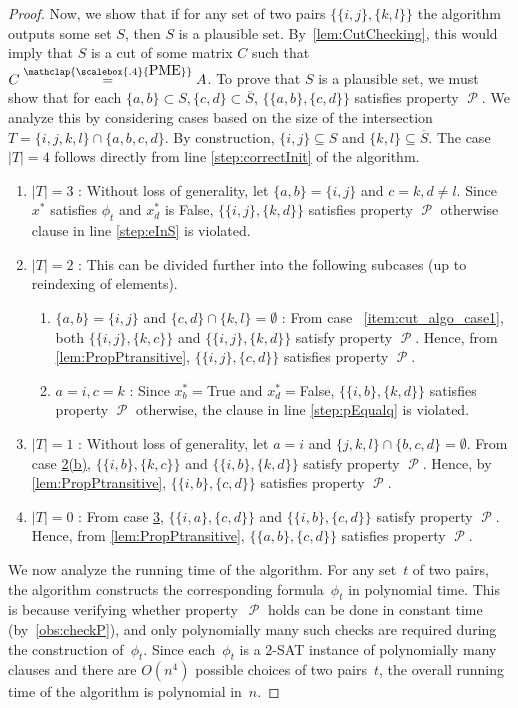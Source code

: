 \documentclass[11pt,letterpaper]{article}
\newcommand{\comp}[1]{\overline{#1}}
\DeclareMathOperator{\calP}{\mathcal{P}}
\newcommand{\pp}[2]{\{\{#1\},\{#2\}\}}
\newcommand{\PME}{\stackrel{\mathclap{\scalebox{.4}{\mbox{PME}}}}{=}}
\begin{document}
{{{\begin{proof}
Now, we show that if for any set of two pairs $\pp{i,j}{k,l}$ the algorithm outputs some set $S$, then $S$ is a plausible set. By~\cref{lem:CutChecking}, this would imply that $S$ is a cut of some matrix $C $ such that $C\PME A$. To prove that $S$ is a plausible set, we must show that for each  $\{a,b\} \subset S, \{c,d\}\subset \comp{S}$, $\pp{a,b}{c,d}$ satisfies property $\calP$. We analyze this by considering cases based on the size of the intersection $T = \{i,j,k,l\}\cap \{a,b,c,d\}$. By construction, $\{i,j\} \subseteq S$ and $\{k,l\} \subseteq \comp{S}$. The case $|T|=4$ follows directly from line \ref{step:correctInit} of the algorithm.
\begin{enumerate}
\item \label{item:cut_algo_case1} $|T|=3$ : Without loss of generality, let $\{a,b\}=\{i,j\}$ and $c=k, d\neq l$. Since $x^*$ satisfies $\phi_t$ and $x^*_d$ is False, $\pp{i,j}{k,d}$ satisfies property $\calP$ otherwise clause in line  \ref{step:eInS} is violated.
\item  $|T|=2$ :  This can be divided further into the following subcases (up to reindexing of elements). 
\begin{enumerate}
\item  $\{a,b\}=\{i,j\}$ and $\{c,d\}\cap \{k,l\}=\emptyset$ : From case ~\ref{item:cut_algo_case1}, both $\pp{i,j}{k,c}$ and $\pp{i,j}{k,d}$ satisfy property $\calP$. Hence, from \cref{lem:PropPtransitive}, $\pp{i,j}{c,d}$ satisfies property $\calP$. 
    \item \label{item:cut_algo_case2b} $a=i, c=k$ : Since $x^*_b=$True and $x^*_d=$False, $\pp{i,b}{k,d}$ satisfies property $\calP$ otherwise, the clause in line \ref{step:pEqualq} is violated. 
\end{enumerate}
\item \label{item:cut_algo_case3} $|T|=1$ : Without loss of generality, let $a=i$ and $\{j,k,l\}\cap\{b,c,d\}=\emptyset$. From case \hyperref[item:cut_algo_case2b]{2(b)}, $\pp{i,b}{k,c}$ and $\pp{i,b}{k,d}$ satisfy property $\calP$. Hence, by \cref{lem:PropPtransitive}, $\pp{i,b}{c,d}$ satisfies property $\calP$. 

\item $|T|=0$ : From case \hyperref[item:cut_algo_case3]{3}, $\pp{i,a}{c,d}$ and $\pp{i,b}{c,d}$ satisfy property $\calP$. Hence, from \cref{lem:PropPtransitive}, $\pp{a,b}{c,d}$ satisfies property $\calP$.
\end{enumerate}

We now analyze the running time of the algorithm. For any set~$t$ of two pairs, the algorithm constructs the corresponding formula~$\phi_t$ in polynomial time. This is because verifying whether property~$\calP$ holds can be done in constant time (by~\cref{obs:checkP}), and only polynomially many such checks are required during the construction of~$\phi_t$. Since each~$\phi_t$ is a 2-SAT instance of polynomially many clauses and there are $O(n^4)$ possible choices of two pairs~$t$, the overall running time of the algorithm is polynomial in~$n$.
\end{proof}

}}}
\end{document}
